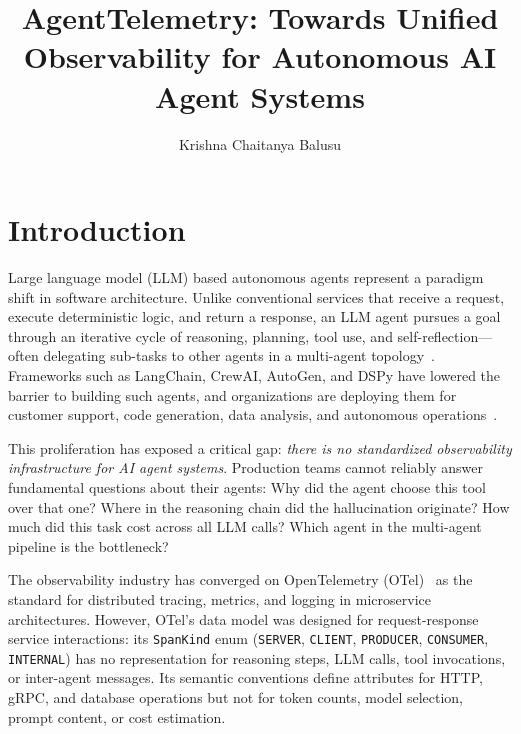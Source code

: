 \documentclass[sigconf,nonacm]{acmart}
\title{AgentTelemetry: Towards Unified Observability for Autonomous AI Agent Systems}
\author{Krishna Chaitanya Balusu}
\affiliation{%
  \institution{Independent Researcher}
  \country{United States}
}
\begin{document}
\maketitle

\section{Introduction}
\label{sec:introduction}

Large language model (LLM) based autonomous agents represent a paradigm shift
in software architecture.  Unlike conventional services that receive a request,
execute deterministic logic, and return a response, an LLM agent pursues a
goal through an iterative cycle of reasoning, planning, tool use, and
self-reflection---often delegating sub-tasks to other agents in a multi-agent
topology~\cite{agentbench,agentboard}.  Frameworks such as LangChain,
CrewAI, AutoGen, and DSPy have lowered the barrier to building such agents,
and organizations are deploying them for customer support, code generation,
data analysis, and autonomous operations~\cite{aiops_survey}.

This proliferation has exposed a critical gap: \emph{there is no
standardized observability infrastructure for AI agent systems}.
Production teams cannot reliably answer fundamental questions about their
agents: Why did the agent choose this tool over that one?  Where in the
reasoning chain did the hallucination originate?  How much did this task
cost across all LLM calls?  Which agent in the multi-agent pipeline is the
bottleneck?

The observability industry has converged on OpenTelemetry
(OTel)~\cite{otel} as the standard for distributed tracing, metrics, and
logging in microservice architectures.  However, OTel's data model was
designed for request-response service interactions: its \texttt{SpanKind}
enum (\texttt{SERVER}, \texttt{CLIENT}, \texttt{PRODUCER}, \texttt{CONSUMER},
\texttt{INTERNAL}) has no representation for reasoning steps, LLM calls,
tool invocations, or inter-agent messages.  Its semantic conventions
define attributes for HTTP, gRPC, and database operations but not for
token counts, model selection, prompt content, or cost estimation.
\end{document}
